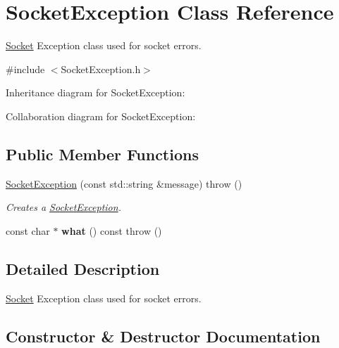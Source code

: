 \hypertarget{classSocketException}{}\section{Socket\+Exception Class Reference}
\label{classSocketException}


\hyperlink{classSocket}{Socket} Exception class used for socket errors.  




{\ttfamily \#include $<$Socket\+Exception.\+h$>$}



Inheritance diagram for Socket\+Exception\+:


Collaboration diagram for Socket\+Exception\+:
\subsection*{Public Member Functions}
\begin{DoxyCompactItemize}
\item 
\hyperlink{classSocketException_af47539ffffa68622ca8107eba744891a}{Socket\+Exception} (const std\+::string \&message)  throw ()
\begin{DoxyCompactList}\small\item\em Creates a \hyperlink{classSocketException}{Socket\+Exception}. \end{DoxyCompactList}\item 
\mbox{\label{classSocketException_a534b0625abe62cad2bae94758aa6eb42}} 
const char $\ast$ {\bfseries what} () const  throw ()
\end{DoxyCompactItemize}


\subsection{Detailed Description}
\hyperlink{classSocket}{Socket} Exception class used for socket errors. 

\subsection{Constructor \& Destructor Documentation}
\mbox{\label{classSocketException_af47539ffffa68622ca8107eba744891a}} 

